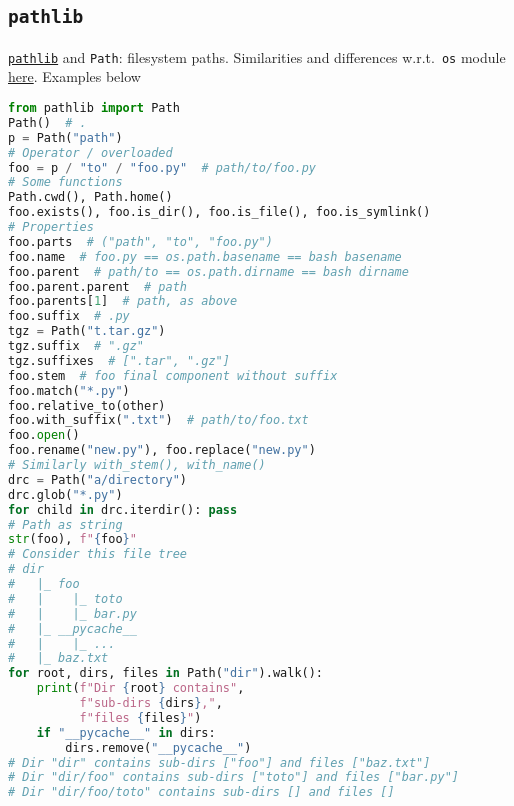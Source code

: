 \documentclass[a4paper,12pt,%
              final%
              ]{article}
\begin{document}
\subsection{\texttt{pathlib}}
\href{https://docs.python.org/3/library/pathlib.html}{\texttt{pathlib}} and \texttt{Path}: filesystem paths. Similarities and differences w.r.t.\ \texttt{os} module \href{https://docs.python.org/3/library/pathlib.html#correspondence-to-tools-in-the-os-module}{here}. Examples below
\begin{lstlisting}[language=python]
from pathlib import Path
Path()  # .
p = Path("path")
# Operator / overloaded
foo = p / "to" / "foo.py"  # path/to/foo.py
# Some functions
Path.cwd(), Path.home()
foo.exists(), foo.is_dir(), foo.is_file(), foo.is_symlink()
# Properties
foo.parts  # ("path", "to", "foo.py")
foo.name  # foo.py == os.path.basename == bash basename
foo.parent  # path/to == os.path.dirname == bash dirname
foo.parent.parent  # path
foo.parents[1]  # path, as above
foo.suffix  # .py
tgz = Path("t.tar.gz")
tgz.suffix  # ".gz"
tgz.suffixes  # [".tar", ".gz"]
foo.stem  # foo final component without suffix
foo.match("*.py")
foo.relative_to(other)
foo.with_suffix(".txt")  # path/to/foo.txt
foo.open()
foo.rename("new.py"), foo.replace("new.py")
# Similarly with_stem(), with_name()
drc = Path("a/directory")
drc.glob("*.py")
for child in drc.iterdir(): pass
# Path as string
str(foo), f"{foo}"
# Consider this file tree
# dir
#   |_ foo
#   |    |_ toto
#   |    |_ bar.py
#   |_ __pycache__
#   |    |_ ...
#   |_ baz.txt
for root, dirs, files in Path("dir").walk():
    print(f"Dir {root} contains",
          f"sub-dirs {dirs},",
          f"files {files}")
    if "__pycache__" in dirs:
        dirs.remove("__pycache__")
# Dir "dir" contains sub-dirs ["foo"] and files ["baz.txt"]
# Dir "dir/foo" contains sub-dirs ["toto"] and files ["bar.py"]
# Dir "dir/foo/toto" contains sub-dirs [] and files []
\end{lstlisting}
\end{document}
